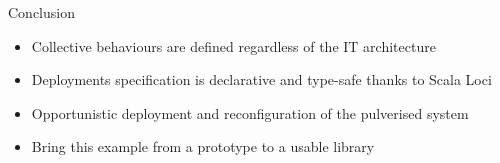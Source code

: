 \begin{frame}{Conclusion}
  \begin{card}[Benefits]
    \begin{itemize}
      \item<1-> Collective behaviours are defined regardless of the IT architecture
      \item<2-> Deployments specification is declarative and type-safe thanks to Scala Loci
    \end{itemize}
  \end{card}
  \pause
  \begin{card}
    \begin{itemize}
      \item <3-> Opportunistic deployment and reconfiguration of the pulverised system
      \item <4-> Bring this example from a prototype to a usable library
    \end{itemize}
  \end{card}
\end{frame}
